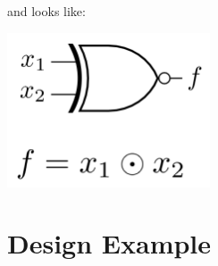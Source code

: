 \documentclass[12pt,openany]{book}
\begin{document}
			      	and looks like:
			      	\begin{center}
			      		\begin{minipage}[c]{0.45\textwidth} %
			      			\centering
			      			\includegraphics[width=0.45\textwidth]{circuits/6.11.2.png} %
			      		\end{minipage}
			      	\end{center}
			      	
			      	\section{Design Example}
\end{document}
